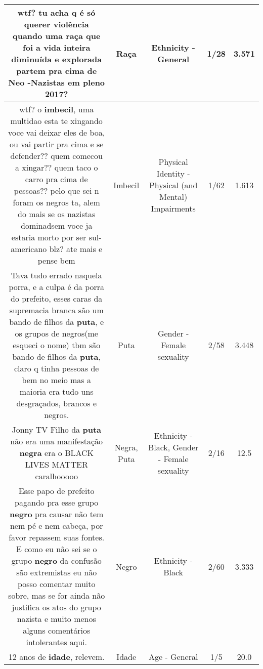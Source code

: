 \documentclass[11pt]{article}
\newlength\mylength
\begin{document}
\begin{center}
\begin{longtable}{|C{.65\mylength}|C{.30\mylength}|C{.12\mylength}|C{.12\mylength}|C{.12\mylength}|}
  \small wtf? tu acha q é só querer violência quando uma \textbf{raça} que foi a vida inteira diminuída e explorada partem pra cima de Neo -Nazistas em pleno 2017?\normalsize   & Raça & Ethnicity - General & 1/28 & 3.571 \\  \hline
  \small wtf? o \textbf{imbecil}, uma multidao esta te xingando voce vai deixar eles de boa, ou vai partir pra cima e se defender?? quem comecou a xingar?? quem taco o carro pra cima de pessoas?? pelo que sei n foram os negros ta, alem do mais se os nazistas dominadsem voce ja estaria morto por ser sul-americano blz? ate mais e pense bem\normalsize   & Imbecil & Physical Identity - Physical (and Mental) Impairments & 1/62 & 1.613 \\  \hline
  \small Tava tudo errado naquela porra, e a culpa é da porra do prefeito, esses caras da supremacia branca são um bando de filhos da \textbf{puta}, e os grupos de negros(me esqueci o nome) tbm são bando de filhos da \textbf{puta}, claro q tinha pessoas de bem no meio mas a maioria era tudo uns desgraçados, brancos e negros.\normalsize   & Puta & Gender - Female sexuality & 2/58 & 3.448 \\  \hline
  \small Jonny TV Filho da \textbf{puta} não era uma manifestação \textbf{negra} era o BLACK LIVES MATTER caralhooooo\normalsize   & Negra, Puta & Ethnicity - Black, Gender - Female sexuality & 2/16 & 12.5 \\  \hline
  \small Esse papo de prefeito pagando pra esse grupo \textbf{negro} pra causar não tem nem pé e nem cabeça, por favor repassem suas fontes. E como eu não sei se o grupo \textbf{negro} da confusão são extremistas eu não posso comentar muito sobre, mas se for ainda não justifica os atos do grupo nazista e muito menos alguns comentários intolerantes aqui.\normalsize   & Negro & Ethnicity - Black & 2/60 & 3.333 \\  \hline
  \small 12 anos de \textbf{idade}, relevem.\normalsize   & Idade & Age - General & 1/5 & 20.0 \\  \hline

\end{longtable}
\end{center}
\end{document}
